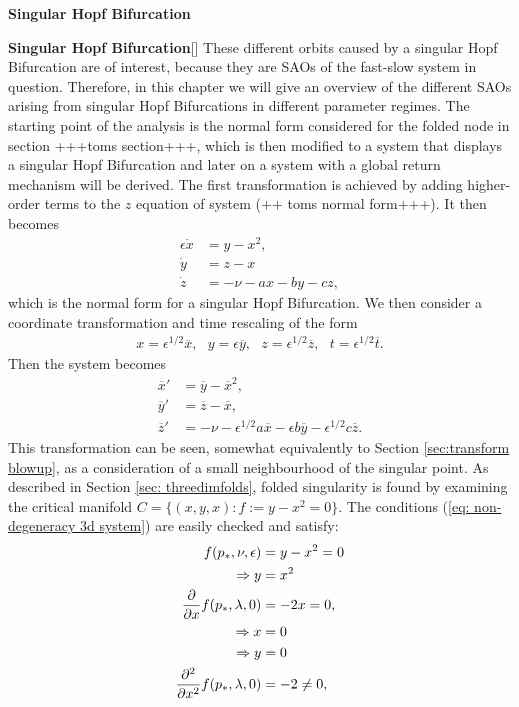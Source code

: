 \begin{theorem}
\begin{theorem}
\begin{theorem}
\begin{definition}{\textbf{Singular Hopf Bifurcation} \citealp{strogatz2007nonlinear}}
\begin{definition}{\textbf{Singular Hopf Bifurcation}}[\citealp{strogatz2007nonlinear}]
These different orbits caused by a singular Hopf Bifurcation are of interest, because they are SAOs of the fast-slow system in question. Therefore, in this chapter we will give an overview of the different SAOs arising from singular Hopf Bifurcations in different parameter regimes.
The starting point of the analysis is the normal form considered for the folded node in section +++toms section+++, which is then modified to a system that displays a singular Hopf Bifurcation and later on a system with a global return mechanism will be derived.
The first transformation is achieved by adding higher-order terms to the $z$ equation of system (++ toms normal form+++). It then becomes
\begin{align*}
\epsilon \dot{x} &= y - x^2, \\
\dot{y} &= z - x \\
\dot{z} &= - \nu -ax - by - cz,
\end{align*}
which is the normal form for a singular Hopf Bifurcation.
We then consider a coordinate transformation and time rescaling of the form
\begin{align*}
x = \epsilon^{1/2}\overline{x}, \ \ \ y= \epsilon \overline{y},  \ \ \ z = \epsilon^{1/2} \overline{z},\ \ \  t= \epsilon^{1/2} \overline{t}.
\end{align*}
Then the system becomes
\begin{align} \label{sysepsilonenvir}
\overline{x}' &= \overline{y} - \overline{x}^2, \\
\overline{y}' &= \overline{z} - \overline{x}, \\
\overline{z}' &= - \nu - \epsilon^{1/2} a \overline{x} - \epsilon b \overline{y} - \epsilon^{1/2} c \overline{z}.
\end{align}
This transformation can be seen, somewhat equivalently to Section \ref{sec:transform blowup}, as a consideration of a small neighbourhood of the singular point.
As described in Section \ref{sec: threedimfolds}, folded singularity is found by examining the critical manifold $C= \{ (x,y,x) : f:=y-x^2 =0 \}$. The conditions (\ref{eq: non-degeneracy 3d system}) are easily checked and satisfy:
\begin{align*}
f(p_*, \nu, \epsilon)&= y- x^2 =0 \\
\Rightarrow y &= x^2\\
\pd{}{x}f(p_*,\lambda,0) &= -2x = 0,\\
\Rightarrow x &= 0\\
\Rightarrow y &=0\\
\pd{^2}{x^2}f(p_*,\lambda,0) &= -2 \neq 0,\\

\end{align*}
\end{definition}
\end{definition}
\end{theorem}
\end{theorem}
\end{theorem}
